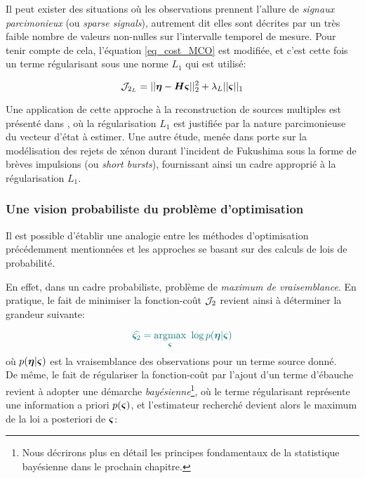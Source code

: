 Il peut exister des situations où les observations prennent l'allure de \textit{signaux parcimonieux} (ou \textit{sparse signals}), autrement dit elles sont décrites par un très faible nombre de valeurs non-nulles sur l'intervalle temporel de mesure. Pour tenir compte de cela, l'équation \eqref{eq_cost_MCO} est modifiée, et c'est cette fois un terme régularisant sous une norme $L_1$ qui est utilisé: 

\begin{equation}
\mathcal{J}_{2_L} = ||{\bm{\eta}} - {\bm{H}}{\bm{\varsigma}}||_2^2 + \lambda_L ||{\bm{\varsigma}}||_1
\label{eq_MCO_L1}
\end{equation}

Une application de cette approche à la reconstruction de sources multiples est présenté dans \cite{Cheng2008}, où la régularisation $L_1$ est justifiée par la nature parcimonieuse du vecteur d'état à estimer. Une autre étude, menée dans \cite{Martinez2013} porte sur la modélisation des rejets de xénon durant l'incident de Fukushima sous la forme de brèves impulsions (ou \textit{short bursts}), fournissant ainsi un cadre approprié à la régularisation $L_1$.

\subsubsection{Une vision probabiliste du problème d'optimisation}

Il est possible d'établir une analogie entre les méthodes d'optimisation précédemment mentionnées et les approches se basant sur des calculs de lois de probabilité.

En effet, dans un cadre probabiliste,  problème de \textit{maximum de vraisemblance}. En pratique, le fait de minimiser la fonction-coût ${\mathcal{J}}_2$ revient ainsi à déterminer la grandeur suivante:

\begin{equation}
\NdFS{
\widehat{\VecSigma_2} = \argmax_\VecSigma~ \log p(\VecObs | \VecSigma)
\label{eq_ML_MCO}
}
\end{equation}
où $p({\bm{\eta}} | {\bm{\varsigma}})$ est la vraisemblance des observations pour un terme source donné. \\

De même, le fait de régulariser la fonction-coût par l'ajout d'un terme d'ébauche revient à adopter une démarche \textit{bayésienne}\footnote{Nous décrirons plus en détail les principes fondamentaux de la statistique bayésienne dans le prochain chapitre.}, où le terme régularisant représente une information a priori $p({\bm{\varsigma}})$, et l'estimateur recherché devient alors le maximum de la loi a posteriori de ${\bm{\varsigma}}$: 

